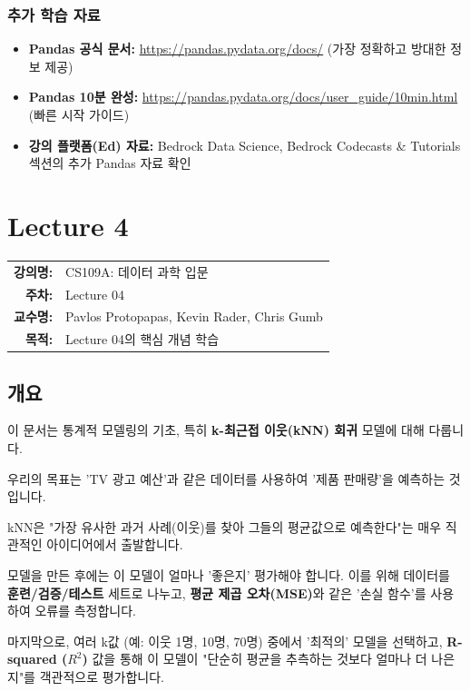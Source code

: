 \documentclass[11pt,a4paper]{book}
\makeatletter
\theoremstyle{definition}
\newcommand{\metainfo}[4]{
\begin{tcolorbox}[
    colback=lightpurple,
    colframe=darkpurple,
    boxrule=1pt,
    arc=2mm,
    left=10pt,
    right=10pt,
    top=8pt,
    bottom=8pt
]
\begin{tabular}{@{}rl@{}}
\textbf{강의명:} & #1 \\[0.3em]
\textbf{주차:} & #2 \\[0.3em]
\textbf{교수명:} & #3 \\[0.3em]
\textbf{목적:} & \begin{minipage}[t]{0.75\textwidth}#4\end{minipage}
\end{tabular}
\end{tcolorbox}
}
\makeatother
\begin{document}
\subsection{추가 학습 자료}

\begin{itemize}
    \item \textbf{Pandas 공식 문서:} \url{https://pandas.pydata.org/docs/} (가장 정확하고 방대한 정보 제공)
    \item \textbf{Pandas 10분 완성:} \url{https://pandas.pydata.org/docs/user_guide/10min.html} (빠른 시작 가이드)
    \item \textbf{강의 플랫폼(Ed) 자료:} Bedrock Data Science, Bedrock Codecasts \& Tutorials 섹션의 추가 Pandas 자료 확인
\end{itemize}


\chapter{Lecture 4}
\label{ch:lecture4}

\metainfo{CS109A: 데이터 과학 입문}{Lecture 04}{Pavlos Protopapas, Kevin Rader, Chris Gumb}{Lecture 04의 핵심 개념 학습}




\section{개요}

이 문서는 통계적 모델링의 기초, 특히 \textbf{k-최근접 이웃(kNN) 회귀} 모델에 대해 다룹니다.

우리의 목표는 'TV 광고 예산'과 같은 데이터를 사용하여 '제품 판매량'을 예측하는 것입니다.

kNN은 "가장 유사한 과거 사례(이웃)를 찾아 그들의 평균값으로 예측한다"는 매우 직관적인 아이디어에서 출발합니다.

모델을 만든 후에는 이 모델이 얼마나 '좋은지' 평가해야 합니다. 이를 위해 데이터를 \textbf{훈련/검증/테스트} 세트로 나누고, \textbf{평균 제곱 오차(MSE)}와 같은 '손실 함수'를 사용하여 오류를 측정합니다.

마지막으로, 여러 k값 (예: 이웃 1명, 10명, 70명) 중에서 '최적의' 모델을 선택하고, \textbf{R-squared ($R^2$)} 값을 통해 이 모델이 "단순히 평균을 추측하는 것보다 얼마나 더 나은지"를 객관적으로 평가합니다.
\end{document}
